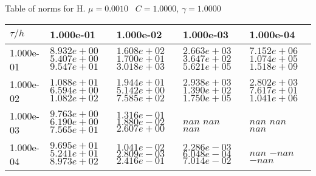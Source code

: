 \begin{center}
Table of norms for H. $\mu = 0.0010$ \, $C = 1.0000$, $\gamma = 1.0000$
  
\begin{tabular}{|p{1in}|p{1in}|p{1in}|p{1in}|p{1in}|} \hline
$\tau / h$ &1.000e-01 &1.000e-02 &1.000e-03 &1.000e-04 \\ \hline 
1.000e-01 & $8.932e+00$  $5.407e+00$  $9.547e+01$  & $1.608e+02$  $1.700e+01$  $3.018e+03$  & $2.663e+03$  $3.647e+02$  $5.621e+05$  & $7.152e+06$  $1.074e+05$  $1.518e+09$  \\ \hline 
1.000e-02 & $1.088e+01$  $6.594e+00$  $1.082e+02$  & $1.944e+01$  $5.142e+00$  $7.585e+02$  & $2.938e+03$  $1.390e+02$  $1.750e+05$  & $2.802e+03$  $7.617e+01$  $1.041e+06$  \\ \hline 
1.000e-03 & $9.763e+00$  $6.190e+00$  $7.565e+01$  & $1.316e-01$  $1.880e-02$  $2.607e+00$  & $nan$  $nan$  $nan$  & $nan$  $nan$  $nan$  \\ \hline 
1.000e-04 & $9.695e+01$  $5.241e+01$  $8.973e+02$  & $1.041e-02$  $2.809e-03$  $2.416e-01$  & $2.286e-03$  $6.048e-04$  $7.014e-02$  & $nan$  $-nan$  $-nan$  \\ \hline 

\end{tabular}\\[20pt]
\end{center}

